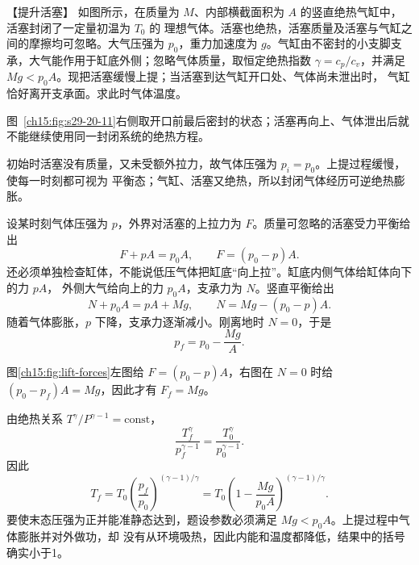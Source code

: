 {\begin{origexamplebox}{【提升活塞】}\label{ch15:ex:s29-20-11}
如图所示，在质量为 $M$、内部横截面积为 $A$ 的竖直绝热气缸中，活塞封闭了一定量初温为 $T_0$ 的
理想气体。活塞也绝热，活塞质量及活塞与气缸之间的摩擦均可忽略。大气压强为 $p_0$，重力加速度为
$g$。气缸由不密封的小支脚支承，大气能作用于缸底外侧；忽略气体质量，取恒定绝热指数
$\gamma=c_p/c_v$，并满足 $Mg<p_0A$。现把活塞缓慢上提；当活塞到达气缸开口处、气体尚未泄出时，
气缸恰好离开支承面。求此时气体温度。
\par\noindent\begin{minipage}{\linewidth}
\liftingPistonQuestionRedraw
{}\label{ch15:fig:s29-20-11}
\end{minipage}\par\medskip
图~\ref{ch15:fig:s29-20-11}右侧取开口前最后密封的状态；活塞再向上、气体泄出后就不能继续使用同一封闭系统的绝热方程。
\end{origexamplebox}\par\nopagebreak[4]

\par\nopagebreak[4]\begin{xesolution}
初始时活塞没有质量，又未受额外拉力，故气体压强为 $p_i=p_0$。上提过程缓慢，使每一时刻都可视为
平衡态；气缸、活塞又绝热，所以封闭气体经历可逆绝热膨胀。

设某时刻气体压强为 $p$，外界对活塞的上拉力为 $F$。质量可忽略的活塞受力平衡给出
\begin{equation*}
  F+pA=p_0A,
  \qquad
  F=(p_0-p)A.
\end{equation*}
还必须单独检查缸体，不能说低压气体把缸底“向上拉”。缸底内侧气体给缸体向下的力 $pA$，
外侧大气给向上的力 $p_0A$，支承力为 $N$。竖直平衡给出
\[
 N+p_0A=pA+Mg,\qquad N=Mg-(p_0-p)A.
\]
随着气体膨胀，$p$ 下降，支承力逐渐减小。刚离地时 $N=0$，于是
\begin{equation*}
  \boxed{p_f=p_0-\frac{Mg}{A}}.
\end{equation*}

\par\noindent\begin{minipage}{\linewidth}
\liftingPistonDiagram
{}\label{ch15:fig:lift-forces}
\end{minipage}\par\medskip
图\ref{ch15:fig:lift-forces}左图给 $F=(p_0-p)A$，右图在 $N=0$ 时给 $(p_0-p_f)A=Mg$，因此才有 $F_f=Mg$。

由绝热关系 $T^\gamma/P^{\gamma-1}=\mathrm{const}$，
\begin{equation*}
  \frac{T_f^\gamma}{p_f^{\gamma-1}}
  =\frac{T_0^\gamma}{p_0^{\gamma-1}}.
\end{equation*}
因此
\begin{equation}
  \boxed{T_f=T_0\left(\frac{p_f}{p_0}\right)^{(\gamma-1)/\gamma}
  =T_0\left(1-\frac{Mg}{p_0A}\right)^{(\gamma-1)/\gamma}}.
\end{equation}
要使末态压强为正并能准静态达到，题设参数必须满足 $Mg<p_0A$。上提过程中气体膨胀并对外做功，却
没有从环境吸热，因此内能和温度都降低，结果中的括号确实小于1。
\end{xesolution}
}

\endgroup

\hypersetup{bookmarksdepth=2}
